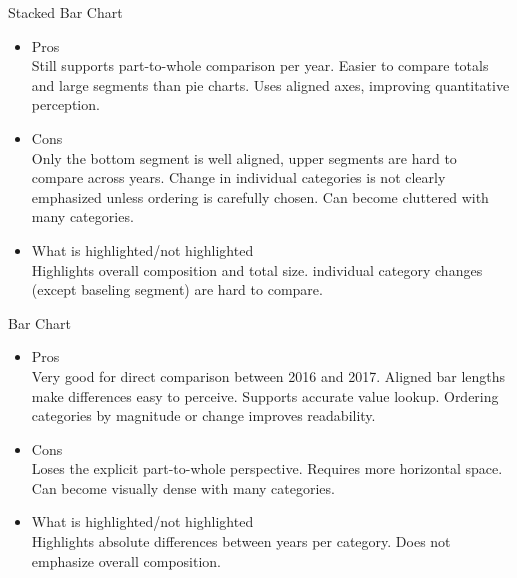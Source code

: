 \begin{exercise}
\begin{enumerate}
\begin{itemize}
                \end{itemize}
                
                Stacked Bar Chart
                \begin{itemize}

                    \item Pros \\
                    Still supports part-to-whole comparison per year.
                    Easier to compare totals and large segments than pie charts.
                    Uses aligned axes, improving quantitative perception. 

                    \item Cons \\
                    Only the bottom segment is well aligned, upper segments are hard to compare across years.
                    Change in individual categories is not clearly emphasized unless  ordering is carefully chosen.
                    Can become cluttered with many categories. 

                    \item What is highlighted/not highlighted \\
                    Highlights overall composition and total size.
                    individual category changes (except baseling segment) are hard to compare.
                \end{itemize}

                Bar Chart
                \begin{itemize}

                    \item Pros \\
                    Very good for direct comparison between 2016 and 2017.
                    Aligned bar lengths make differences easy to perceive.
                    Supports accurate value lookup.
                    Ordering categories by magnitude or change improves readability.

                    \item Cons \\
                    Loses the explicit part-to-whole perspective.
                    Requires more horizontal space.
                    Can become visually dense with many categories. 

                    \item What is highlighted/not highlighted \\
                    Highlights absolute differences between years per category.
                    Does not emphasize overall composition. 


\end{itemize}
\end{enumerate}
\end{exercise}
